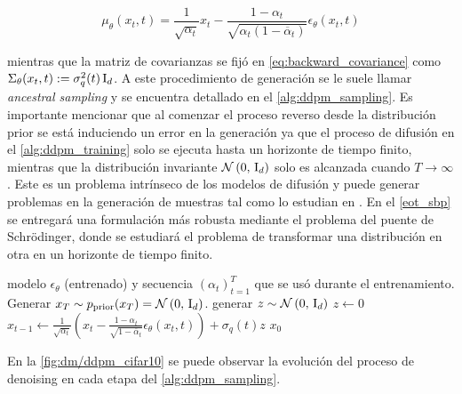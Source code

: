 \begin{equation}
    \mu_\theta(x_t,t) = \frac{1}{\sqrt{\alpha_t}}x_t - \frac{1-\alpha_t}{\sqrt{\alpha_t(1-\overline{\alpha}_t)}}\epsilon_\theta(x_t,t)
\end{equation}

mientras que la matriz de covarianzas se fijó en \eqref{eq:backward_covariance} como $\Sigma_\theta(x_t,t):=\sigma_q^2(t)\operatorname{I}_{d}$. A este procedimiento de generación se le suele llamar \textit{ancestral sampling} y se encuentra detallado en el \autoref{alg:ddpm_sampling}. Es importante mencionar que al comenzar el proceso reverso desde la distribución prior se está induciendo un error en la generación ya que el proceso de difusión en el \autoref{alg:ddpm_training} solo se ejecuta hasta un horizonte de tiempo finito, mientras que la distribución invariante $\mathcal{N}\left(0,\,\operatorname{I}_{d}\right)$ solo es alcanzada cuando $T\to\infty$. Este es un problema intrínseco de los modelos de difusión y puede generar problemas en la generación de muestras tal como lo estudian en \cite{debortoli2023diffusion}. En el \autoref{eot_sbp} se entregará una formulación más robusta mediante el problema del puente de Schrödinger, donde se estudiará el problema de transformar una distribución en otra en un horizonte de tiempo finito.

\begin{algorithm}
    \caption{Ancestral sampling}
    \label{alg:ddpm_sampling}
    \begin{algorithmic}[1]
        \Require modelo $\epsilon_\theta$ (entrenado) y secuencia $(\alpha_t)_{t=1}^T$ que se usó durante el entrenamiento.
        \State Generar $x_T\sim p_{\operatorname{prior}}(x_T)=\mathcal{N}\left(0,\,\operatorname{I}_{d}\right)$.
        \State generar $z\sim\mathcal{N}\left(0,\,\operatorname{I}_{d}\right)$
        \Else
        \State $z \gets 0$
        \EndIf
        \State $x_{t-1} \gets \frac{1}{\sqrt{\alpha_t}}\left(x_t-\frac{1-\alpha_t}{\sqrt{1-\overline{\alpha}_t}}\epsilon_\theta(x_t,t)\right) + \sigma_q(t) z$
        \EndFor
        \State \Return $x_0$
    \end{algorithmic}
\end{algorithm}

En la \autoref{fig:dm/ddpm_cifar10} se puede observar la evolución del proceso de denoising en cada etapa del \autoref{alg:ddpm_sampling}.


